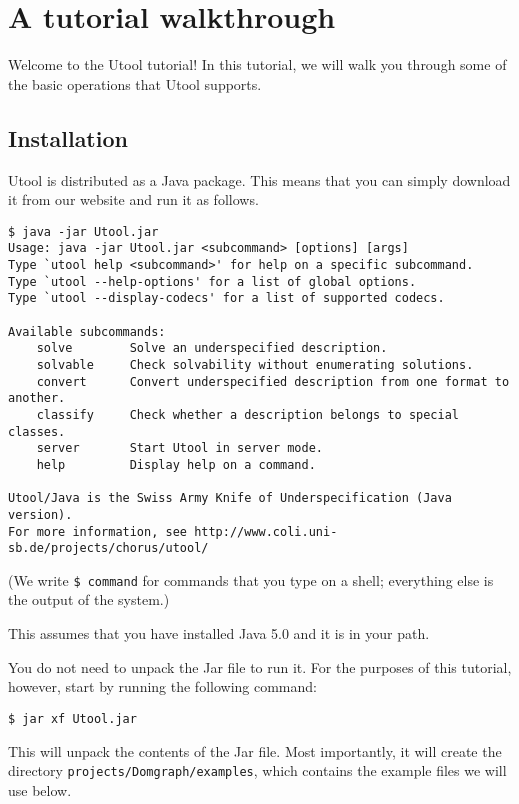 
\section{A tutorial walkthrough}
\label{sec:tutorial}

Welcome to the Utool tutorial! In this tutorial, we will walk you
through some of the basic operations that Utool supports.



\subsection{Installation}

Utool is distributed as a Java package. This means that you can simply
download it from our website and run it as follows.

\begin{verbatim}
$ java -jar Utool.jar
Usage: java -jar Utool.jar <subcommand> [options] [args]
Type `utool help <subcommand>' for help on a specific subcommand.
Type `utool --help-options' for a list of global options.
Type `utool --display-codecs' for a list of supported codecs.

Available subcommands:
    solve        Solve an underspecified description.
    solvable     Check solvability without enumerating solutions.
    convert      Convert underspecified description from one format to another.
    classify     Check whether a description belongs to special classes.
    server       Start Utool in server mode.
    help         Display help on a command.

Utool/Java is the Swiss Army Knife of Underspecification (Java version).
For more information, see http://www.coli.uni-sb.de/projects/chorus/utool/
\end{verbatim}

(We write \verb?$ command? %
for commands that you type on a shell; everything else is the output
of the system.)

This assumes that you have installed Java 5.0 and it is in your path.

You do not need to unpack the Jar file to run it. For the purposes of
this tutorial, however, start by running the following command:

\begin{verbatim}
$ jar xf Utool.jar
\end{verbatim}

This will unpack the contents of the Jar file. Most importantly, it
will create the directory \verb?projects/Domgraph/examples?, which
contains the example files we will use below.




